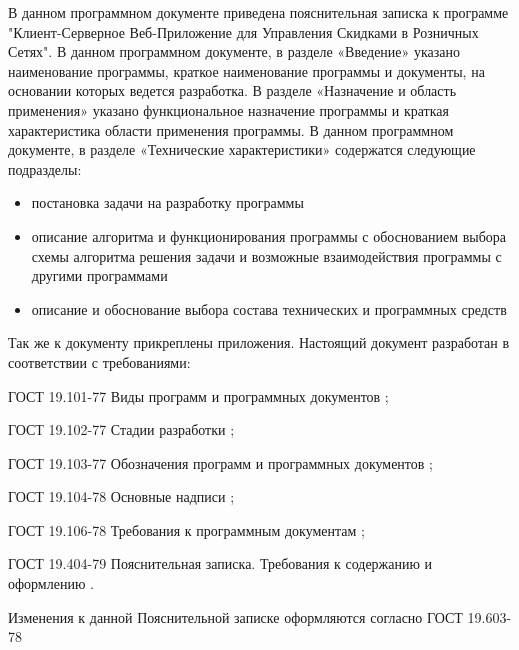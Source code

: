 

В данном программном документе приведена пояснительная записка к программе 
"Клиент-Серверное Веб-Приложение для Управления Скидками в Розничных Сетях".
В данном программном документе, в разделе «Введение» указано наименование 
программы, краткое наименование программы и документы, на основании которых 
ведется разработка.
В разделе «Назначение и область применения» указано функциональное назначение 
программы и краткая характеристика области применения программы.
В данном программном документе, в разделе «Технические характеристики» 
содержатся следующие подразделы:
\begin{itemize}
    \item постановка задачи на разработку программы
    \item описание алгоритма и функционирования программы с обоснованием выбора 
    схемы алгоритма решения задачи и возможные взаимодействия программы с 
    другими программами
    \item описание и обоснование выбора состава технических и программных 
    средств
\end{itemize}
Так же к документу прикреплены приложения. 
Настоящий документ разработан в соответствии с требованиями:
\begin{my_enumerate}
  \item ГОСТ 19.101-77 Виды программ и программных документов \cite{gost_types_of_software};
    \item ГОСТ 19.102-77 Стадии разработки \cite{gost_stages_of_devel};
    \item ГОСТ 19.103-77 Обозначения программ и программных документов
      \cite{gost_marking_software};
    \item ГОСТ 19.104-78 Основные надписи \cite{gost_main_signs};
    \item ГОСТ 19.106-78 Требования к программным документам
      \cite{gost_demands_for_docs};
    \item ГОСТ 19.404-79 Пояснительная записка. Требования к содержанию и 
      оформлению \cite{gost_pz}.
\end{my_enumerate}
    Изменения к данной Пояснительной записке оформляются согласно ГОСТ 
19.603-78 \cite{gost_main_rules_change}
